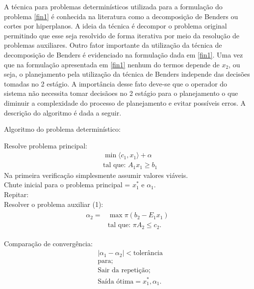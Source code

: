 A t\'ecnica para problemas determin\'isticos utilizada para a formula\c c\~ao do problema \ref{fin1} \'e conhecida na literatura como
a decomposi\c c\~ao de Benders \cite{benders} ou cortes por hiperplanos. A ideia da t\'ecnica \'e decompor o problema original permitindo que esse
seja resolvido de forma iterativa por meio da resolu\c c\~ao de problemas auxiliares. Outro fator importante da
utiliza\c c\~ao da t\'ecnica de decomposi\c c\~ao de Benders \'e evidenciado na formula\c c\~ao dada em \ref{fin1}. Uma
vez que na formula\c c\~ao apresentada em \ref{fin1} nenhum do termos depende de $x_2$, ou seja, o planejamento pela
utiliza\c c\~ao da t\'ecnica de Benders independe das decis\~oes tomadas no 2 est\'agio. A import\^ancia desse fato
deve-se que o operador do sistema n\~ao necessita tomar decis\~aoes no 2 est\'agio para o planejamento o que diminuir a
complexidade do processo de planejamento e evitar poss\'iveis erros.
A descri\c c\~ao do algoritmo \'e
dada a seguir.

\begin{center}
Algoritmo do problema determin\'istico:\\
\end{center}
Resolve problema principal:
\begin{align*}
&\min \langle c_1,x_1\rangle + \alpha \nonumber\\
&\mbox{tal que: }	A_1 x_1 \geq b_1
\end{align*}
Na primeira verifica\c c\~ao simplesmente assumir valores vi\'aveis.\\
Chute inicial para o problema principal = $x_1^{*}$ e $\alpha_1$.\\
Repitar:\\
Resolver  o problema auxiliar (1):
\begin{align*}
  \begin{split}	
 \alpha_2= &\max \pi (b_2 - E_1x_1 ) \\
	&\mbox{tal que: }\pi A_2  \leq c_2.
  \end{split}
\end{align*}

	Compara\c c\~ao de converg\^encia:
		\begin{align*}
			&|\alpha_1 - \alpha_2|< \mbox{toler\^ancia}\\
			&\mbox{para;}\\
			&\mbox{Sair da repeti\c c\~ao;}\\
			&\mbox{Sa\'ida \'otima} = x_1^{*}, \alpha_1.
		\end{align*}

